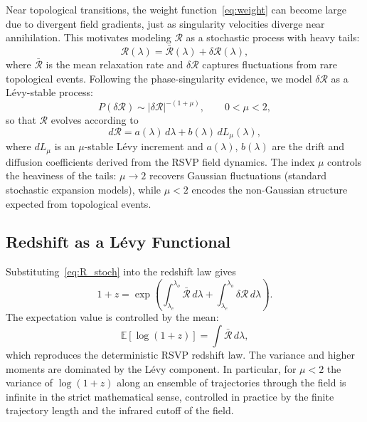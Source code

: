 \documentclass[12pt,a4paper]{article}
\theoremstyle{remark}
\newcommand{\Rcal}{\mathcal{R}}
\begin{document}
Near topological transitions, the weight function~\eqref{eq:weight} can become
large due to divergent field gradients, just as singularity velocities diverge
near annihilation. This motivates modeling $\Rcal$ as a stochastic process
with heavy tails:
\begin{equation}
\Rcal(\lambda) = \bar{\Rcal}(\lambda) + \delta\Rcal(\lambda),
\label{eq:R_stoch}
\end{equation}
where $\bar{\Rcal}$ is the mean relaxation rate and $\delta\Rcal$ captures
fluctuations from rare topological events. Following the phase-singularity
evidence, we model $\delta\Rcal$ as a L\'{e}vy-stable process:
\begin{equation}
P(\delta\Rcal) \sim |\delta\Rcal|^{-(1+\mu)}, \qquad 0 < \mu < 2,
\label{eq:levy}
\end{equation}
so that $\Rcal$ evolves according to
\begin{equation}
d\Rcal = a(\lambda)\,d\lambda + b(\lambda)\,dL_\mu(\lambda),
\end{equation}
where $dL_\mu$ is an $\mu$-stable L\'{e}vy increment and $a(\lambda)$,
$b(\lambda)$ are the drift and diffusion coefficients derived from the RSVP
field dynamics. The index $\mu$ controls the heaviness of the tails: $\mu \to 2$
recovers Gaussian fluctuations (standard stochastic expansion models), while
$\mu < 2$ encodes the non-Gaussian structure expected from topological events.

\subsection{Redshift as a L\'{e}vy Functional}

Substituting~\eqref{eq:R_stoch} into the redshift law gives
\begin{equation}
1 + z = \exp\!\left(\int_{\lambda_e}^{\lambda_o}\bar{\Rcal}\,d\lambda
                  + \int_{\lambda_e}^{\lambda_o}\delta\Rcal\,d\lambda\right).
\label{eq:z_levy}
\end{equation}
The expectation value is controlled by the mean:
\begin{equation}
\mathbb{E}[\log(1+z)] = \int\bar{\Rcal}\,d\lambda,
\end{equation}
which reproduces the deterministic RSVP redshift law. The variance and higher
moments are dominated by the L\'{e}vy component. In particular, for $\mu < 2$
the variance of $\log(1+z)$ along an ensemble of trajectories through the
field is infinite in the strict mathematical sense, controlled in practice by
the finite trajectory length and the infrared cutoff of the field.
\end{document}
